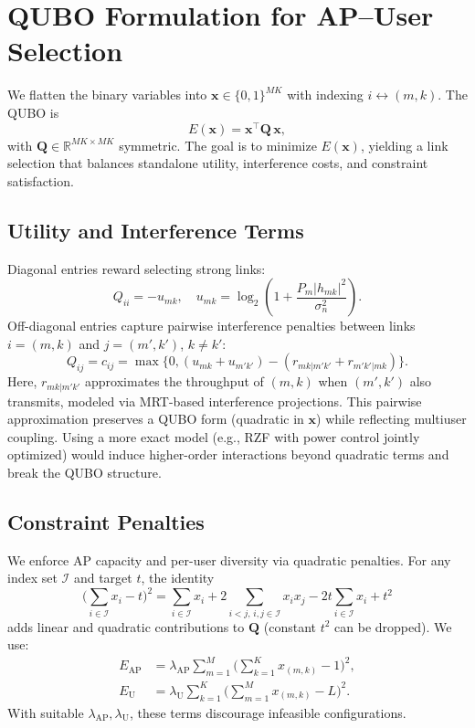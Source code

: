 {\section{QUBO Formulation for AP–User Selection}
We flatten the binary variables into $\mathbf{x}\in\{0,1\}^{MK}$ with indexing $i\leftrightarrow (m,k)$. The QUBO is
\begin{equation}
E(\mathbf{x})=\mathbf{x}^\top \mathbf{Q}\,\mathbf{x},
\end{equation}
with $\mathbf{Q}\in\mathbb{R}^{MK\times MK}$ symmetric. The goal is to minimize $E(\mathbf{x})$, yielding a link selection that balances standalone utility, interference costs, and constraint satisfaction.

\subsection{Utility and Interference Terms}
Diagonal entries reward selecting strong links:
\begin{equation}
Q_{ii}=-u_{mk},\quad u_{mk}=\log_2\!\left(1+\frac{P_m|h_{mk}|^2}{\sigma_n^2}\right).
\end{equation}
Off-diagonal entries capture pairwise interference penalties between links $i=(m,k)$ and $j=(m',k')$, $k\neq k'$:
\begin{equation}
Q_{ij}=c_{ij}=\max\!\Big\{0,(u_{mk}+u_{m'k'}) -(r_{mk|m'k'}+r_{m'k'|mk})\Big\}.
\end{equation}
Here, $r_{mk|m'k'}$ approximates the throughput of $(m,k)$ when $(m',k')$ also transmits, modeled via MRT-based interference projections. This pairwise approximation preserves a QUBO form (quadratic in $\mathbf{x}$) while reflecting multiuser coupling. Using a more exact model (e.g., RZF with power control jointly optimized) would induce higher-order interactions beyond quadratic terms and break the QUBO structure.

\subsection{Constraint Penalties}
We enforce AP capacity and per-user diversity via quadratic penalties. For any index set $\mathcal{I}$ and target $t$, the identity
\begin{equation}
\bigg(\sum_{i\in \mathcal{I}} x_i - t\bigg)^2=\sum_{i\in\mathcal{I}}x_i + 2\!\!\sum_{i<j,\,i,j\in\mathcal{I}}\!\! x_ix_j - 2t\sum_{i\in\mathcal{I}}x_i + t^2
\end{equation}
adds linear and quadratic contributions to $\mathbf{Q}$ (constant $t^2$ can be dropped). We use:
\begin{align}
E_{\text{AP}}&=\lambda_{\text{AP}} \sum_{m=1}^M \Big(\sum_{k=1}^K x_{(m,k)} - 1\Big)^2,\\
E_{\text{U}}&=\lambda_{\text{U}} \sum_{k=1}^K \Big(\sum_{m=1}^M x_{(m,k)} - L\Big)^2.
\end{align}
With suitable $\lambda_{\text{AP}},\lambda_{\text{U}}$, these terms discourage infeasible configurations.

}

